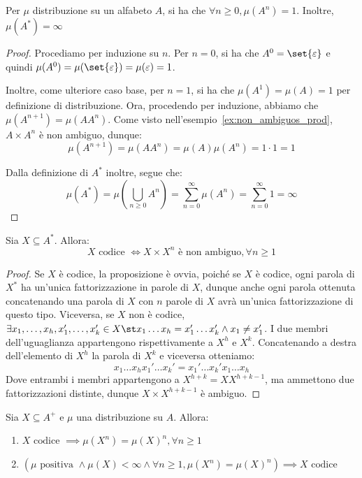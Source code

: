\begin{proposition}[label=prop:A_power_mesure_1]{}
  Per \(\mu\) distribuzione su un alfabeto \(A\), si ha che \(\forall n \geq 0, \mu(A^n) = 1\).
  Inoltre, \(\mu(A^*) = \infty\)
\end{proposition}
\begin{proof}
  Procediamo per induzione su \(n\).
  Per \(n=0\), si ha che \(A^0 = \set{\varepsilon}\) e quindi \(\mu(A^0) = \mu(\set{\varepsilon}) = \mu(\varepsilon) = 1\).

  Inoltre, come ulteriore caso base, per \(n=1\), si ha che \(\mu(A^1) = \mu(A) = 1\) per definizione di distribuzione.
  Ora, procedendo per induzione, abbiamo che \(\mu(A^{n+1}) = \mu(AA^n)\).
  Come visto nell'esempio~\ref{ex:non_ambiguos_prod}, \(A \times A^n\) è non ambiguo, dunque:
  \[\mu(A^{n+1}) = \mu(AA^n) = \mu(A)\mu(A^n) = 1 \cdot 1 = 1 \]

  Dalla definizione di \(A^*\) inoltre, segue che:
  \[\mu(A^*) = \mu(\bigcup_{n\geq0} A^n) = \sum_{n=0}^{\infty} \mu(A^n) = \sum_{n=0}^{\infty} 1 = \infty\]
\end{proof}

\begin{proposition}[label=prop:code_iff_not_ambiguos]{}
  Sia \(X \subseteq A^*\). Allora:
  \[X \text{ codice } \iff X\times X^n \text{ è non ambiguo},\forall n \geq 1\]
\end{proposition}
\begin{proof}
  Se \(X\) è codice, la proposizione è ovvia, poiché se \(X\) è codice, ogni parola di \(X^*\) ha un'unica fattorizzazione in parole di \(X\), dunque anche ogni parola ottenuta concatenando una parola di \(X\) con \(n\) parole di \(X\) avrà un'unica fattorizzazione di questo tipo.
  Viceversa, se \(X\) non è codice, \(\exists x_1,\ldots,x_h,x_1',\ldots,x_k' \in X \st x_1\ldots x_h = x_1'\ldots x_k' \land x_1 \neq x_1'\).
  I due membri dell'uguaglianza appartengono rispettivamente a \(X^h\) e \(X^k\).
  Concatenando a destra dell'elemento di \(X^h\) la parola di \(X^k\) e viceversa otteniamo:
  \[x_1\ldots x_h x_1'\ldots x_k' = x_1'\ldots x_k' x_1\ldots x_h\]
  Dove entrambi i membri appartengono a \(X^{h+k} = X  X^{h+k-1}\), ma ammettono due fattorizzazioni distinte, dunque \(X \times X^{h+k-1}\) è ambiguo.
\end{proof}

\begin{proposition}[label=prop:code_implies_equal_mesures_of_powers]{}
  Sia \(X \subseteq A^+\) e \(\mu\) una distribuzione su \(A\). Allora:
  \begin{enumerate}
    \item \(X \text{ codice } \implies \mu(X^n) = {\mu(X)}^n, \forall n \geq 1\)\label{item:code_implies_measure_product}
    \item \((\mu \text{ positiva } \land \mu(X) < \infty \land \forall n \geq 1, \mu(X^n) = {\mu(X)}^n )\implies X \text{ codice}\)\label{item:measure_product_implies_code}
  \end{enumerate}
\end{proposition}

